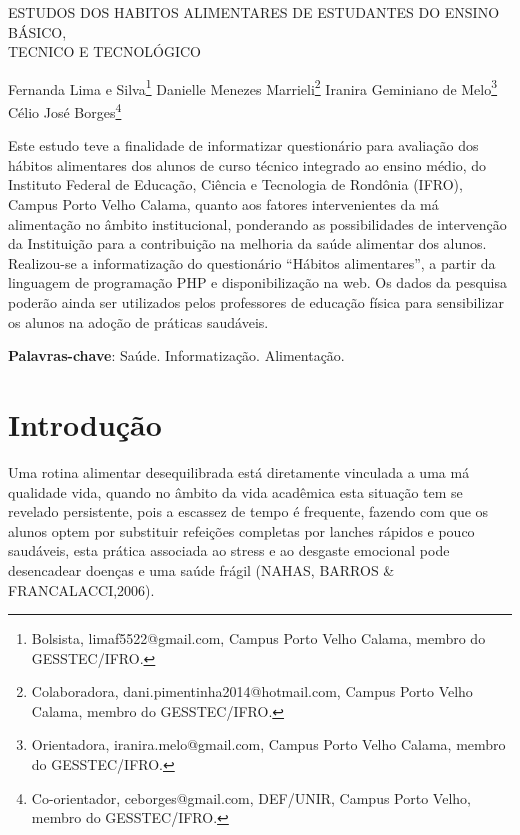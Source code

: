 \documentclass[article,12pt,onesidea,4paper,english,brazil]{abntex2}
\begin{document}
	
	
	\frenchspacing 
	
	\begin{center}
		\LARGE ESTUDOS DOS HABITOS ALIMENTARES DE ESTUDANTES DO ENSINO BÁSICO,\\TECNICO E TECNOLÓGICO
		
		\normalsize
		Fernanda Lima e Silva\footnote {Bolsista, limaf5522@gmail.com, Campus Porto Velho Calama, membro do GESSTEC/IFRO. } 
		Danielle Menezes Marrieli\footnote{Colaboradora, dani.pimentinha2014@hotmail.com, Campus Porto Velho Calama, membro do GESSTEC/IFRO.} 
		Iranira Geminiano de Melo\footnote{Orientadora, iranira.melo@gmail.com, Campus Porto Velho Calama, membro do GESSTEC/IFRO. } 
		Célio José Borges\footnote {Co-orientador, ceborges@gmail.com, DEF/UNIR, Campus Porto Velho, membro do GESSTEC/IFRO.} 
	\end{center}
	
	\begin{resumoumacoluna}
		Este estudo teve a finalidade de informatizar questionário para avaliação dos hábitos alimentares dos alunos de curso técnico integrado ao ensino médio, do Instituto Federal de Educação, Ciência e Tecnologia de Rondônia (IFRO), Campus Porto Velho Calama, quanto aos fatores intervenientes da má alimentação no âmbito institucional, ponderando as possibilidades de intervenção da Instituição para a contribuição na melhoria da saúde alimentar dos alunos. Realizou-se a informatização do questionário “Hábitos alimentares”, a partir da linguagem de programação PHP e disponibilização na web. Os dados da pesquisa poderão ainda ser utilizados pelos professores de educação física para sensibilizar os alunos na adoção de práticas saudáveis.
		
		
		\vspace{\onelineskip}
		
		\noindent
		\textbf{Palavras-chave}: Saúde. Informatização. Alimentação.
	\end{resumoumacoluna}
	
	\section*{Introdução}
	
Uma rotina alimentar desequilibrada está diretamente vinculada a uma má qualidade vida, quando no âmbito da vida acadêmica esta situação tem se revelado persistente, pois a escassez de tempo é frequente, fazendo com que os alunos optem por substituir refeições completas por lanches rápidos e pouco saudáveis, esta prática associada ao stress e ao desgaste emocional pode desencadear doenças e uma saúde frágil (NAHAS, BARROS \& FRANCALACCI,2006).
\end{document}
